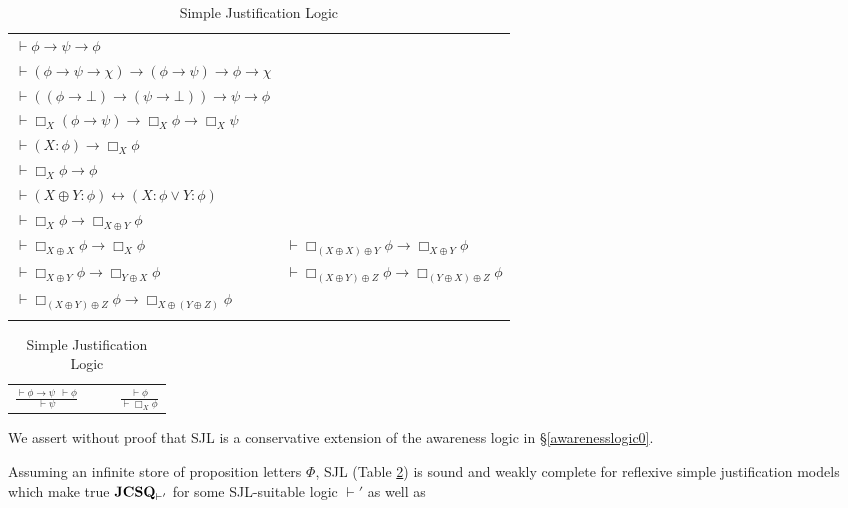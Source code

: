 \begin{table}[h]
\centering
  \begin{tabular}{ll}
    $\vdash \phi \rightarrow \psi \rightarrow \phi$ & \\
    $\vdash (\phi \rightarrow \psi \rightarrow \chi) \rightarrow (\phi
    \rightarrow \psi) \rightarrow \phi \rightarrow \chi$ & \\
    $\vdash ((\phi \rightarrow \bot) \rightarrow (\psi \rightarrow \bot))
    \rightarrow \psi \rightarrow \phi$ & \\
    $\vdash \Box_X (\phi \rightarrow \psi) \rightarrow \Box_X \phi \rightarrow
    \Box_X \psi$ & \\
    $\vdash (X : \phi) \rightarrow \Box_X \phi$ & \\
    $\vdash \Box_X \phi \rightarrow \phi$ & \\
    $\vdash (X \oplus Y : \phi) \leftrightarrow (X : \phi \vee Y :
    \phi)$ & \\
    $\vdash \Box_X \phi \rightarrow \Box_{X \oplus Y} \phi$ & \\
    $\vdash \Box_{X \oplus X} \phi \rightarrow \Box_X \phi$ & $\vdash \Box_{(X
    \oplus X) \oplus Y} \phi \rightarrow \Box_{X \oplus Y} \phi$ \\
    $\vdash \Box_{X \oplus Y} \phi \rightarrow \Box_{Y \oplus X} \phi$ &
    $\vdash \Box_{(X \oplus Y) \oplus Z} \phi \rightarrow \Box_{(Y \oplus X)
    \oplus Z} \phi$\\
    $\vdash \Box_{(X \oplus Y) \oplus Z} \phi \rightarrow \Box_{X \oplus (Y
    \oplus Z)} \phi$ & \\
    & 
  \end{tabular}

\begin{tabular}{lll}
      $\displaystyle\frac{\vdash \phi \rightarrow \psi \ \  \vdash \phi}{\vdash
      \psi}$ & {\ \ } & $\displaystyle\frac{\vdash \phi}{\vdash \Box_X \phi}$
    \end{tabular}
  \caption{\label{logic5}Simple Justification Logic}
\end{table}

We assert without proof that SJL is a conservative extension of the awareness logic in
{\S}\ref{awarenesslogic0}.

\begin{theorem}
  \label{completeness5}Assuming an infinite store of proposition letters
  $\Phi$, SJL (Table \ref{logic5}) is sound and weakly complete for reflexive simple justification models
  which make true $\textup{{\bfseries{JCSQ}}}_{\vdash'}$ for some
  SJL-suitable logic $\vdash'$ as well as
\end{theorem}


